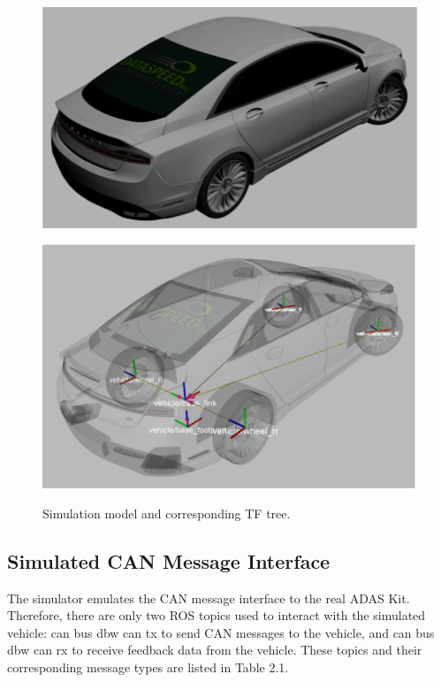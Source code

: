 \begin{figure}
\centering
\begin{minipage}{.5\textwidth}
  \centering
  \includegraphics[width=0.9\linewidth]{figs/ch2/mkz-model}
  \label{fig:sub1}
\end{minipage}%
\begin{minipage}{.5\textwidth}
  \centering
  \includegraphics[width=0.82\linewidth]{figs/ch2/mkz-tf-tree}
  \label{fig:sub2}
\end{minipage}
\caption{Simulation model and corresponding TF tree.}
\label{fig:test}
\end{figure}

\subsection{Simulated CAN Message Interface}

The simulator emulates the CAN message interface to the real ADAS Kit. Therefore, there are only two ROS topics used to interact with the simulated vehicle: can bus dbw  can tx to send CAN messages to the vehicle, and can bus dbw  can rx to receive feedback data from the vehicle. These topics and their corresponding message types are listed in Table 2.1.

